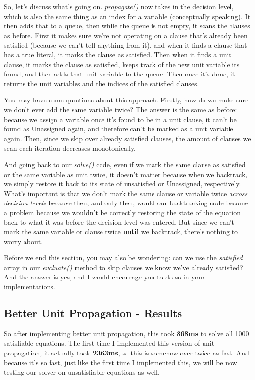 \documentclass[../main.tex]{subfiles}
\begin{document}
So, let's discuss what's going on. \textit{propagate()} now takes in the decision level, 
which is also the same thing as an index for a variable (conceptually speaking). It then 
adds that to a queue, then while the queue is not empty, it scans the clauses as before. 
First it makes sure we're not operating on a clause that's already been satisfied 
(because we can't tell anything from it), and when it finds a clause that has a true literal, 
it marks the clause as satisfied. Then when it finds a unit clause, it marks the clause as 
satisfied, keeps track of the new unit variable its found, and then adds that unit variable 
to the queue. Then once it's done, it returns the unit variables and the indices of the satisfied 
clauses.

You may have some questions about this approach. Firstly, how do we make sure we don't 
ever add the same variable twice? The answer is the same as before: because we assign a 
variable once it's found to be in a unit clause, it can't be found as Unassigned again, 
and therefore can't be marked as a unit variable again. Then, since we skip over already 
satisfied clauses, the amount of clauses we scan each iteration decreases monotonically. 

And going back to our \textit{solve()} code, even if we mark the same clause as satisfied 
or the same variable as unit twice, it doesn't matter because when we backtrack, we simply 
restore it back to its state of unsatisfied or Unassigned, respectively. What's important is 
that we don't mark the same clause or variable twice \textit{across decision levels} because 
then, and only then, would our backtracking code become a problem because we wouldn't be 
correctly restoring the state of the equation back to what it was before the decision level 
was entered. But since we can't mark the same variable or clause twice \textbf{until}
we backtrack, there's nothing to worry about.

Before we end this section, you may also be wondering: can we use the \textit{satisfied}
array in our \textit{evaluate()} method to skip clauses we know we've already satisfied?
And the answer is yes, and I would encourage you to do so in your implementations.

\subsection{Better Unit Propagation - Results}
So after implementing better unit propagation, this took \textbf{868ms} to solve all 1000 
satisfiable equations. The first time I implemented this version of unit propagation,
it actually took \textbf{2363ms}, so this is somehow over twice as fast. And because it's so 
fast, just like the first time I implemented this, we will be now testing our solver on 
unsatisfiable equations as well.
\end{document}
